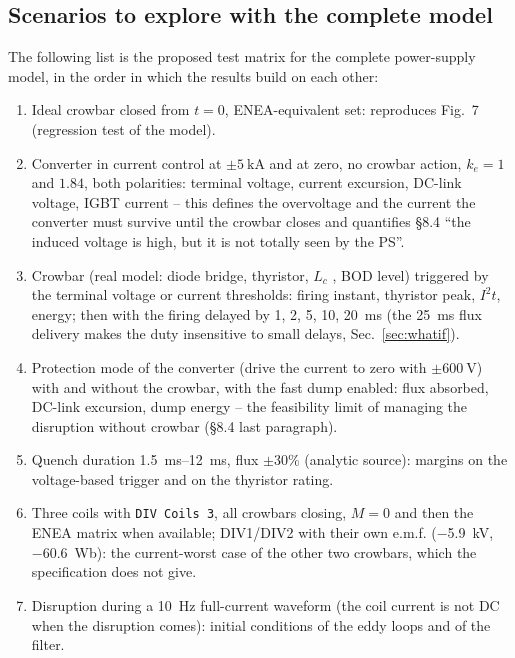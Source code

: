 \documentclass[11pt,a4paper]{article}
\newcommand{\code}[1]{\texttt{#1}}
\begin{document}
\subsection{Scenarios to explore with the complete model}
\label{sec:scenarios}
The following list is the proposed test matrix for the complete power-supply model, in the order in which the results build on each other:
\begin{enumerate}[label=S\arabic*.]
\item Ideal crowbar closed from $t = 0$, ENEA-equivalent set: reproduces Fig.~7 (regression test of the model).
\item Converter in current control at $\pm\SI{5}{\kilo\ampere}$ and at zero, no crowbar action, $k_e = 1$ and $1.84$, both polarities: terminal voltage, current excursion, DC-link voltage, IGBT current -- this defines the overvoltage and the current the converter must survive until the crowbar closes and quantifies \S8.4 ``the induced voltage is high, but it is not totally seen by the PS''.
\item Crowbar (real model: diode bridge, thyristor, $L_c$ \cite{lc_note}, BOD level) triggered by the terminal voltage or current thresholds: firing instant, thyristor peak, $I^2t$, energy; then with the firing delayed by \SI{1}{}, \SI{2}{}, \SI{5}{}, \SI{10}{}, \SI{20}{\milli\second} (the \SI{25}{\milli\second} flux delivery makes the duty insensitive to small delays, Sec.~\ref{sec:whatif}).
\item Protection mode of the converter (drive the current to zero with $\pm\SI{600}{\volt}$) with and without the crowbar, with the fast dump enabled: flux absorbed, DC-link excursion, dump energy -- the feasibility limit of managing the disruption without crowbar (\S8.4 last paragraph).
\item Quench duration \SIrange{1.5}{12}{\milli\second}, flux $\pm 30\%$ (analytic source): margins on the voltage-based trigger and on the thyristor rating.
\item Three coils with \code{DIV Coils 3}, all crowbars closing, $M = 0$ and then the ENEA matrix when available; DIV1/DIV2 with their own e.m.f. (\SI{-5.9}{\kilo\volt}, \SI{-60.6}{\weber}): the current-worst case of the other two crowbars, which the specification does not give.
\item Disruption during a \SI{10}{\hertz} full-current waveform (the coil current is not DC when the disruption comes): initial conditions of the eddy loops and of the filter.
\end{enumerate}
\end{document}

